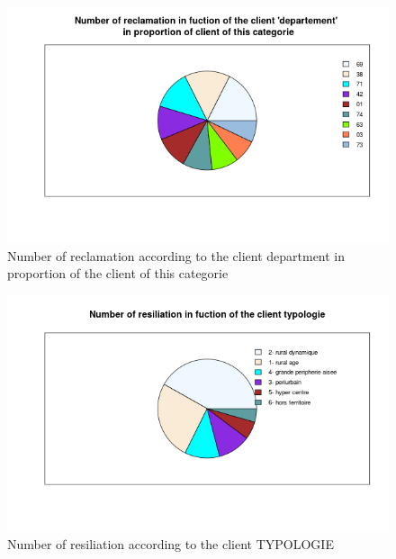 \documentclass[a4paper, 11pt]{article}
\begin{document}
        \begin{figure}[!ht]
        	\centering
                \includegraphics[height = 10 cm]{Valentin/Number_of_reclamation_in_fuction_of_the_client_departement_proportion.png}
                \caption{Number of reclamation according to the client department in proportion of the client of this categorie}
                \label{fig:reclamtion_dep3}
        \end{figure}
        
        

        \begin{figure}[!ht]
        	\centering
                \includegraphics[height = 10 cm]{Valentin/Number_of_resiliation_in_fuction_of_the_client_typologie.png}
                \caption{Number of resiliation according to the client TYPOLOGIE}
                \label{fig:resiliation_typo1}
        \end{figure}
        
\end{document}
